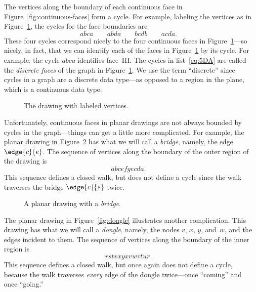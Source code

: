 The vertices along the boundary of each continuous face in
Figure~\ref{fig:continuous-faces} form a cycle.  For example, labeling the
vertices as in Figure~\ref{fig:continuous-cycles}, the cycles for the face
boundaries are
\begin{equation}\label{eq:5DA}
abca \qquad abda \qquad bcdb \qquad acda.
\end{equation}
These four cycles correspond nicely to the four continuous faces in
Figure~\ref{fig:continuous-cycles}---so nicely, in fact, that we can
identify each of the faces in Figure~\ref{fig:continuous-cycles} by
its cycle.  For example, the cycle $abca$ identifies
face~III\@.  The cycles in list~\ref{eq:5DA} are called the
\emph{discrete faces} of the graph in
Figure~\ref{fig:continuous-cycles}.  We use the term ``discrete''
since cycles in a graph are a discrete data type---as opposed to a
region in the plane, which is a continuous data type.

\begin{figure}


\caption{The drawing with labeled vertices.}
\label{fig:continuous-cycles}
\end{figure}

Unfortunately, continuous faces in planar drawings are not always
bounded by cycles in the graph---things can get a little more
complicated.  For example, the planar drawing in
Figure~\ref{fig:bridge} has what we will call a \emph{bridge}, namely,
the edge $\edge{c}{e}$.  The sequence of vertices along the boundary
of the outer region of the drawing is
\[
abcefgecda.
\]
This sequence defines a closed walk, but does not define a cycle since
the walk traverses the bridge $\edge{c}{e}$ twice.

\begin{figure}


\caption{A planar drawing with a \emph{bridge}.}
\label{fig:bridge}
\end{figure}

The planar drawing in Figure~\ref{fig:dongle} illustrates another
complication.  This drawing has what we will call a \emph{dongle},
namely, the nodes $v$, $x$, $y$, and~$w$, and the edges incident to
them.  The sequence of vertices along the boundary
of the inner region is
\[
rstvxyxvwvtur.
\]
This sequence defines a closed walk, but once again does not define a
cycle, because the walk traverses \emph{every} edge of the dongle
twice---once ``coming'' and once ``going.''

